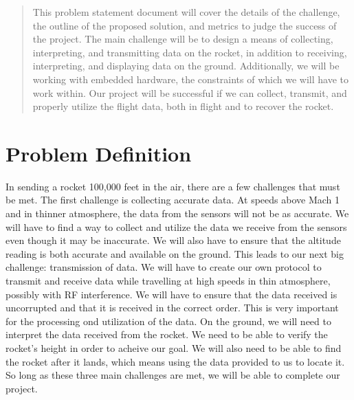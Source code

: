 \documentclass[onecolumn, draftclsnofoot,10pt, compsoc]{IEEEtran}
\begin{document}
\begin{titlepage}
\begin{singlespace}
\begin{abstract}
          This problem statement document will cover the details of the challenge, the outline of the proposed solution, and metrics to judge the success of the project.
          The main challenge will be to design a means of collecting, interpreting, and transmitting data on the rocket, in addition to receiving, interpreting, and displaying data on the ground.
          Additionally, we will be working with embedded hardware, the constraints of which we will have to work within.
          Our project will be successful if we can collect, transmit, and properly utilize the flight data, both in flight and to recover the rocket.
        \end{abstract}     
    \end{singlespace}
\end{titlepage}
{}
\clearpage

\section{Problem Definition}
In sending a rocket 100,000 feet in the air, there are a few challenges that must be met.
The first challenge is collecting accurate data.
At speeds above Mach 1 and in thinner atmosphere, the data from the sensors will not be as accurate.
We will have to find a way to collect and utilize the data we receive from the sensors even though it may be inaccurate.
We will also have to ensure that the altitude reading is both accurate and available on the ground.
This leads to our next big challenge: transmission of data.
We will have to create our own protocol to transmit and receive data while travelling at high speeds in thin atmosphere, possibly with RF interference.
We will have to ensure that the data received is uncorrupted and that it is received in the correct order.
This is very important for the processing ond utilization of the data.
On the ground, we will need to interpret the data received from the rocket.
We need to be able to verify the rocket's height in order to acheive our goal.
We will also need to be able to find the rocket after it lands, which means using the data provided to us to locate it.
So long as these three main challenges are met, we will be able to complete our project.
\end{document}
